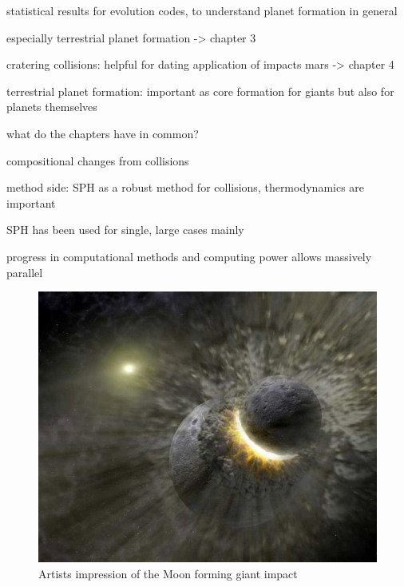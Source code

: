 statistical results for evolution codes, to understand planet formation in general 

especially terrestrial planet formation \cite{2006Icar..184...39O} 
\cite{Lisse:2009p3131} -> chapter 3

cratering collisions: helpful for dating 
application of impacts mars -> chapter 4




\cite{Chambers:2004p4098}

terrestrial planet formation: important as core formation for giants but also for planets themselves


what do the chapters have in common?

compositional changes from collisions

method side: SPH as a robust method for collisions, thermodynamics are important

SPH has been used for single, large cases mainly \cite{2005Natur.435..629S}

progress in computational methods and computing power allows massively parallel 


\begin{figure}
\begin{center}
\includegraphics[scale=0.6]{01planet-collision.jpg}
\caption{Artists impression of the Moon forming giant impact}
\label{ch01_fig01}
\end{center}
\end{figure}








